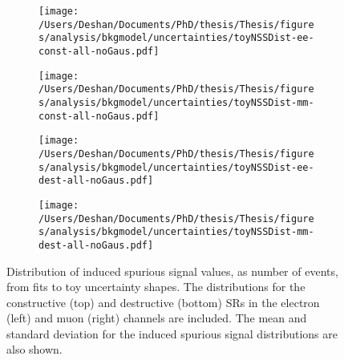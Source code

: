 \begin{figure}[h!]
    \centering
    \begin{subfigure}[b]{0.49\textwidth}
        \centering
        \texttt{[image: /Users/Deshan/Documents/PhD/thesis/Thesis/figures/analysis/bkgmodel/uncertainties/toyNSSDist-ee-const-all-noGaus.pdf]}
        \label{fig:bkgmodel:issu1}
    \end{subfigure}
    \begin{subfigure}[b]{0.49\textwidth}
        \centering
        \texttt{[image: /Users/Deshan/Documents/PhD/thesis/Thesis/figures/analysis/bkgmodel/uncertainties/toyNSSDist-mm-const-all-noGaus.pdf]}
        \label{fig:bkgmodel:issu2}
    \end{subfigure}
    \begin{subfigure}[b]{0.49\textwidth}
        \centering
        \texttt{[image: /Users/Deshan/Documents/PhD/thesis/Thesis/figures/analysis/bkgmodel/uncertainties/toyNSSDist-ee-dest-all-noGaus.pdf]}
        \label{fig:bkgmodel:issu3}
    \end{subfigure}
    \begin{subfigure}[b]{0.49\textwidth}
        \centering
        \texttt{[image: /Users/Deshan/Documents/PhD/thesis/Thesis/figures/analysis/bkgmodel/uncertainties/toyNSSDist-mm-dest-all-noGaus.pdf]}
        \label{fig:bkgmodel:issu4}
    \end{subfigure}
    \caption[Induced spurious signal distributions from fits to toy uncertainties.]{Distribution of induced spurious signal values, as number of events, from fits to toy uncertainty shapes. The distributions for the constructive (top) and destructive (bottom) SRs in the electron (left) and muon (right) channels are included. The mean and standard deviation for the induced spurious signal distributions are also shown.}
    \label{fig:bkgmodel:issu}
\end{figure}

